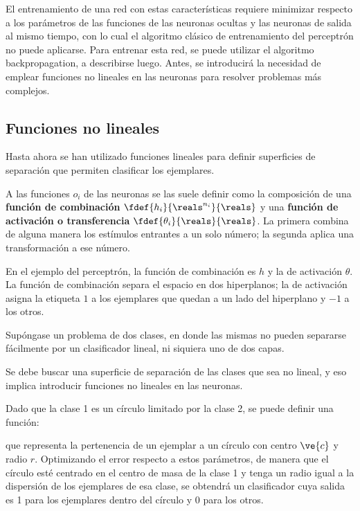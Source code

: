 El entrenamiento de una red con estas características requiere minimizar respecto a los parámetros de las funciones de las neuronas ocultas y las neuronas de salida al mismo tiempo, con lo cual el algoritmo clásico de entrenamiento del perceptrón no puede aplicarse. Para entrenar esta red, se puede utilizar el algoritmo backpropagation, a describirse luego. Antes, se introducirá la necesidad de emplear funciones no lineales en las neuronas para resolver problemas más complejos.

\subsection{Funciones no lineales}

Hasta ahora se han utilizado funciones lineales para definir superficies de separación que permiten clasificar los ejemplares. 

A las funciones $o_i$ de las neuronas se las suele definir como la composición de una \textbf{función de combinación} $\fdef{h_i}{\reals^{n_i}}{\reals}$ y una \textbf{función de activación o transferencia} $\fdef{\theta_i}{\reals}{\reals}$. La primera combina de alguna manera los estímulos entrantes a un solo número; la segunda aplica una transformación a ese número. 

En el ejemplo del perceptrón, la función de combinación es $h$ y la de activación $\theta$. La función de combinación separa el espacio en dos hiperplanos; la de activación asigna la etiqueta $1$ a los ejemplares que quedan a un lado del hiperplano y $-1$ a los otros. 

Supóngase un problema de dos clases, en donde las mismas no pueden separarse fácilmente por un clasificador lineal, ni siquiera uno de dos capas. 


Se debe buscar una superficie de separación de las clases que sea no lineal, y eso implica introducir funciones no lineales en las neuronas.

Dado que la clase 1 es un círculo limitado por la clase 2, se puede definir una función:

que representa la pertenencia de un ejemplar a un círculo con centro $\ve{c}$ y radio $r$. Optimizando el error respecto a estos parámetros, de manera que el círculo esté centrado en el centro de masa de la clase 1 y tenga un radio igual a la dispersión de los ejemplares de esa clase, se obtendrá un clasificador cuya salida es 1 para los ejemplares dentro del círculo y 0 para los otros.  


